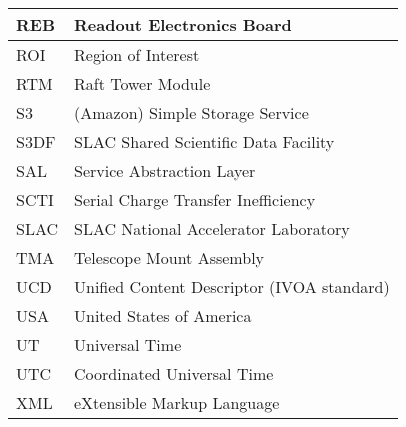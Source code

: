 \begin{longtable}{p{}p{}}
REB & Readout Electronics Board \\\hline
ROI & Region of Interest \\\hline
RTM & Raft Tower Module \\\hline
S3 & (Amazon) Simple Storage Service \\\hline
S3DF & SLAC Shared Scientific Data Facility \\\hline
SAL & Service Abstraction Layer \\\hline
SCTI & Serial Charge Transfer Inefficiency \\\hline
SLAC & SLAC National Accelerator Laboratory \\\hline
TMA & Telescope Mount Assembly \\\hline
UCD & Unified Content Descriptor (IVOA standard) \\\hline
USA & United States of America \\\hline
UT & Universal Time \\\hline
UTC & Coordinated Universal Time \\\hline
XML & eXtensible Markup Language \\\hline
\end{longtable}
